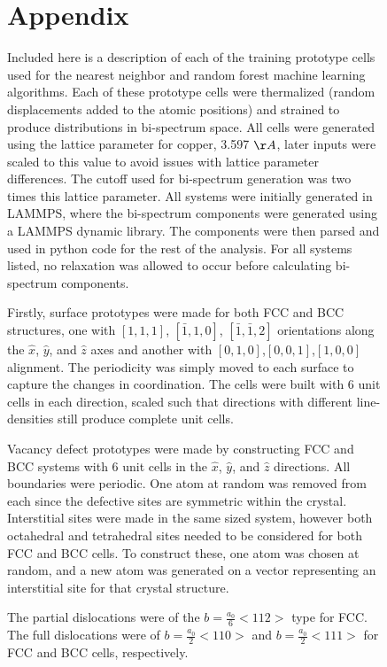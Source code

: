 \documentclass[12pt]{iopart}
\begin{document}
\begin{figure}[htbp]
\section{Appendix}
\label{AppendixA} %

Included here is a description of each of the training prototype cells used for the nearest neighbor and random forest machine learning algorithms. Each of these prototype cells were thermalized (random displacements added to the atomic positions) and strained to produce distributions in bi-spectrum space. All cells were generated using the lattice parameter for copper, 3.597 $\AA$, later inputs were scaled to this value to avoid issues with lattice parameter differences. The cutoff used for bi-spectrum generation was two times this lattice parameter. All systems were initially generated in LAMMPS, where the bi-spectrum components were generated using a LAMMPS dynamic library. The components were then parsed and used in python code for the rest of the analysis. For all systems listed, no relaxation was allowed to occur before calculating bi-spectrum components.

Firstly, surface prototypes were made for both FCC and BCC structures, one with $[1,1,1]$, $[\bar{1},1,0]$, $[\bar{1},\bar{1},2]$ orientations along the $\hat{x}$, $\hat{y}$, and $\hat{z}$ axes and another with $[0,1,0]$,$[0,0,1]$,$[1,0,0]$ alignment. The periodicity was simply moved to each surface to capture the changes in coordination. The cells were built with 6 unit cells in each direction, scaled such that directions with different line-densities still produce complete unit cells.

Vacancy defect prototypes were made by constructing FCC and BCC systems with 6 unit cells in the $\hat{x}$, $\hat{y}$, and $\hat{z}$ directions. All boundaries were periodic. One atom at random was removed from each since the defective sites are symmetric within the crystal. Interstitial sites were made in the same sized system, however both octahedral and tetrahedral sites needed to be considered for both FCC and BCC cells. To construct these, one atom was chosen at random, and a new atom was generated on a vector representing an interstitial site for that crystal structure.

The partial dislocations were of the $b=\frac{a_0}{6}<112>$ type for FCC. The full dislocations were of $b=\frac{a_0}{2}<110>$ and $b=\frac{a_0}{2}<111>$ for FCC and BCC cells, respectively.


\end{figure}
\end{document}
